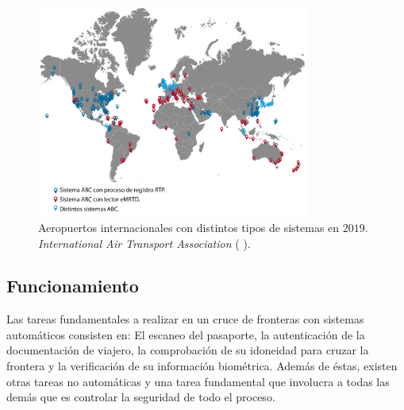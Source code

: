 \begin{figure}
    \centering
    \includegraphics[width=0.8\textwidth]{ch-sistemasABC/images/ch-SistemasABC/AeropuertosConSistemasABCMapaIATA.png}
    \caption{Aeropuertos internacionales con distintos tipos de sistemas  en $2019$. \textit{International Air Transport Association} ( \cite{IATAOnline}).}
    \label{fig:MapaABCMudialesIATA}
\end{figure}


\subsection{Funcionamiento}\label{sec:funcionamientoABC}

Las tareas fundamentales a realizar en un cruce de fronteras con sistemas automáticos consisten en: El escaneo del pasaporte, la autenticación de la documentación de viajero, la comprobación de su idoneidad para cruzar la frontera y la verificación de su información biométrica. Además de éstas, existen otras tareas no automáticas y una tarea fundamental que involucra a todas las demás que es controlar la seguridad de todo el proceso.

